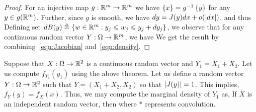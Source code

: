\documentclass[letterpaper,10pt,english]{article}
\begin{document}
\begin{proof}
For an injective map $g: \mathbb{R}^m \to \mathbb{R}^m$ we have $\left\{x\right\} = g^{-1}\left\{y\right\}$ for any $y \in g(\mathbb{R}^m)$. 
Further, since $g$ is smooth, we have $dy = J(y)dx + o(\left\lvert dx\right\rvert)$, 
and thus
Defining set $dB(y) \triangleq \left\{w \in \mathbb{R}^m: y_j \leqslant w_j \leqslant y_j+dy_j\right\}$, 
we observe that for any continuous random vector $Y: \Omega \to \mathbb{R}^m$, we have 
We get the result by combining~\eqref{eqn:Jacobian} and~\eqref{eqn:density}.
\end{proof}
\begin{shaded}
\begin{exmp}
Suppose that $X: \Omega \to \mathbb{R}^2$ is a continuous random vector and $Y_1 = X_1 + X_2$. 
Let us compute $f_{Y_1}(y_1)$ using the above theorem. 
Let us define a random vector $Y: \Omega \to \mathbb{R}^2$ such that $Y = (X_1+X_2, X_2)$ 
so that $\left\lvert J(y)\right\rvert = 1$.
This implies, $f_{Y}(y) = f_{X}(x)$.
Thus, we may compute the marginal density of $Y_1$ as,
If $X$ is an independent random vector, then 
where $*$ represents convolution.
\end{exmp}
\end{shaded}
\end{document}
